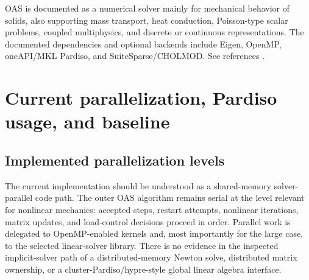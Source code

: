 \documentclass[10pt,a4paper]{article}
\begin{document}
OAS is documented as a numerical solver mainly for mechanical behavior of solids, also supporting mass transport, heat conduction, Poisson-type scalar problems, coupled multiphysics, and discrete or continuous representations. The documented dependencies and optional backends include Eigen, OpenMP, oneAPI/MKL Pardiso, and SuiteSparse/CHOLMOD. See references \cite{oasrepo,oasdocs,oascmake,oasmain,oaslinalg,eigensparse,eigencg,eigencholmod,eigenpardiso,pardiso}.

\section{Current parallelization, Pardiso usage, and baseline}

\subsection*{Implemented parallelization levels}

The current implementation should be understood as a shared-memory solver-parallel code path. The outer OAS algorithm remains serial at the level relevant for nonlinear mechanics: accepted steps, restart attempts, nonlinear iterations, matrix updates, and load-control decisions proceed in order. Parallel work is delegated to OpenMP-enabled kernels and, most importantly for the large case, to the selected linear-solver library. There is no evidence in the inspected implicit-solver path of a distributed-memory Newton solve, distributed matrix ownership, or a cluster-Pardiso/hypre-style global linear algebra interface.
\end{document}

